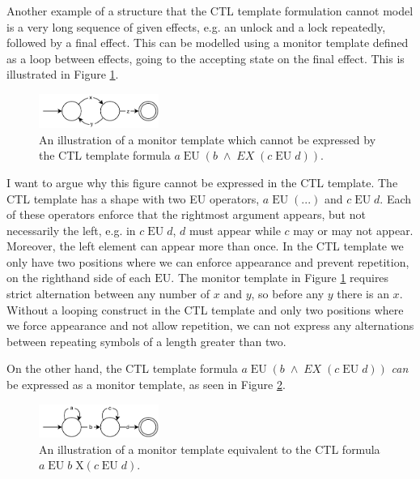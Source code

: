 \newpar Another example of a structure that the CTL template formulation cannot model is a very long sequence of given effects, e.g. an unlock and a lock repeatedly, followed by a final effect. This can be modelled using a monitor template defined as a loop between effects, going to the accepting state on the final effect. This is illustrated in Figure \ref{long-monitor}. 

\begin{figure}[H]
    \centering
    \includegraphics[width=0.35\textwidth]{evaluation/figures/long-monitor}
    \caption{An illustration of a monitor template which cannot be expressed by the CTL template formula $a\;\text{EU}\;(b\;\land\;EX\;(c\;\text{EU}\;d))$.}
    \label{long-monitor}
\end{figure}

\newpar I want to argue why this figure cannot be expressed in the CTL template. The CTL template has a shape with two EU operators, $a\;\text{EU}\;(...)$ and $c\;\text{EU}\;d$. Each of these operators enforce that the rightmost argument appears, but not necessarily the left, e.g. in $c\;\text{EU}\;d$, $d$ must appear while $c$ may or may not appear. Moreover, the left element can appear more than once. In the CTL template we only have two positions where we can enforce appearance and prevent repetition, on the righthand side of each $\text{EU}$. The monitor template in Figure \ref{long-monitor} requires strict alternation between any number of $x$ and $y$, so before any $y$ there is an $x$. Without a looping construct in the CTL template and only two positions where we force appearance and not allow repetition, we can not express any alternations between repeating symbols of a length greater than two. 

\newpar On the other hand, the CTL template formula $a\;\text{EU}\;(b\;\land\;EX\;(c\;\text{EU}\;d))$ \textit{can} be expressed as a monitor template, as seen in Figure \ref{ctl-as-monitor}. 

\begin{figure}[H]
    \centering
    \includegraphics[width=0.35\textwidth]{evaluation/figures/ctl-as-monitor}
    \caption{An illustration of a monitor template equivalent to the CTL formula $a\;\text{EU}\;b\;\text{X}(c\;\text{EU}\;d)$.}
    \label{ctl-as-monitor}
\end{figure}

